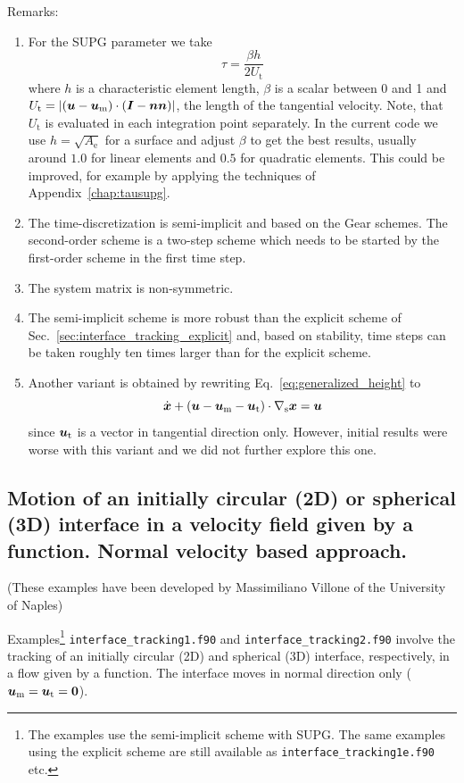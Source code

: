 Remarks:
\begin{enumerate}
\item
For the SUPG parameter we take
\[
    \tau=\frac{\beta h}{2U_\text{t}}
\]
where $h$ is a characteristic element length, $\beta$ is a scalar between 0 and
1 and $U_\text{t}=|(\boldsymbol{u} - \boldsymbol{u}_\text{m})\cdot(\boldsymbol{I} -\boldsymbol{n} \boldsymbol{n})|$,
the length of the tangential velocity. Note, that $U_\text{t}$ is evaluated in
each integration point separately. In the current code we use 
$h=\sqrt{A_\text{e}}$ for a surface and adjust $\beta$ to get the best results,
usually around $1.0$ for linear elements and $0.5$ for quadratic elements.
This could be improved, for example by applying
the techniques of Appendix~\ref{chap:tausupg}.
\item The time-discretization is semi-implicit and
based on the Gear schemes. The
second-order scheme is a two-step scheme which needs to be started by the
first-order scheme in the first time step.
\item The system matrix is non-symmetric.
\item The semi-implicit scheme is more robust than the explicit scheme of
Sec.~\ref{sec:interface_tracking_explicit} and, based on stability,
time steps can be taken roughly
ten times larger than for the explicit scheme.
\item Another variant is obtained by rewriting
Eq.~\eqref{eq:generalized_height} to
\begin{equation}
   \dot{\boldsymbol{x}} +
   (\boldsymbol{u} - \boldsymbol{u}_\text{m}-\boldsymbol{u}_\text{t})\cdot\nabla_\text{s}\boldsymbol{x}
        = \boldsymbol{u} 
   \label{eq:generalized_height2}
\end{equation}
since $\boldsymbol{u}_\text{t}$ is a vector in tangential direction only. However,
initial results were worse with this variant and we did not further explore
this one.
\end{enumerate}


\subsection{Motion of an initially circular (2D) or spherical (3D) interface 
in a velocity field given by a function. Normal velocity based approach.}
\label{sec:interface_function}

(These examples have been developed by Massimiliano Villone of the University of
Naples)

Examples\footnote{The examples use the semi-implicit scheme with SUPG.
The same examples using the explicit scheme are still available as
 \texttt{interface\_tracking1e.f90} etc.}
 \texttt{interface\_tracking1.f90} and \texttt{interface\_tracking2.f90}
involve the tracking of an initially circular (2D) and spherical (3D)
interface, respectively, 
in a flow given by a function. The interface moves in normal direction only
($\boldsymbol{u}_\text{m}=\boldsymbol{u}_\text{t}=\boldsymbol{0}$).

